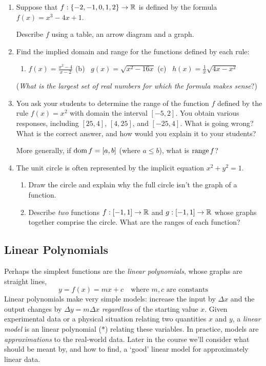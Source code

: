 \begin{exercises}{}{}
\begin{enumerate}
	  
	  \item Suppose that $f:\{-2,-1,0,1,2\}\to\mathbb{R}$ is defined by the formula $f(x)=x^3-4x+1$.\par
	  Describe $f$ using a table, an arrow diagram and a graph.
	  
	  
	  \item Find the implied domain and range for the functions defined by each rule:
	  \begin{enumerate}
	    \item $f(x)=\frac{x^2-4}{x-2}$\qquad\qquad
	    (b) \ $g(x)=\sqrt{x^2-16x}$\qquad\qquad
	    (c) \ $h(x)=\frac 1x\sqrt{4x-x^2}$
	  \end{enumerate}
	  (\emph{What is the largest set of real numbers for which the formula makes sense}?)
	  
	  
	  \item You ask your students to determine the range of the function $f$ defined by the rule $f(x)=x^2$ with domain the interval $[-5,2]$. You obtain various responses, including $[25,4]$, $[4,25]$, and $[-25,4]$. What is going wrong? What is the correct answer, and how would you explain it to your students?\par
	  More generally, if $\operatorname{dom} f=[a,b]$ (where $a\le b$), what is $\operatorname{range} f$?
	  
	  
	  \item The unit circle is often represented by the implicit equation $x^2+y^2=1$.
	  \begin{enumerate}
	    \item Draw the circle and explain why the full circle isn't the graph of a function.
	    \item Describe \emph{two} functions $f:[-1,1]\to\mathbb{R}$ and $g:[-1,1]\to\mathbb{R}$ whose graphs together comprise the circle. What are the ranges of each function?
	  \end{enumerate}
	  
	\end{enumerate}
\end{exercises}



\clearpage



\subsection{Linear Polynomials}

Perhaps the simplest functions are the \emph{linear polynomials}, whose graphs are straight lines,
\[
	y=f(x)=mx+c\quad\text{where $m,c$ are constants} \tag{$\ast$}
\]
Linear polynomials make very simple models: increase the input by $\Delta x$ and the output changes by $\Delta y=m\Delta x$ \emph{regardless} of the starting value $x$. Given experimental data or a physical situation relating two quantities $x$ and $y$, a \emph{linear model} is an linear polynomial ($\ast$) relating these variables. In practice, models are \emph{approximations} to the real-world data. Later in the course we'll consider what should be meant by, and how to find, a `good' linear model for approximately linear data.\smallbreak

